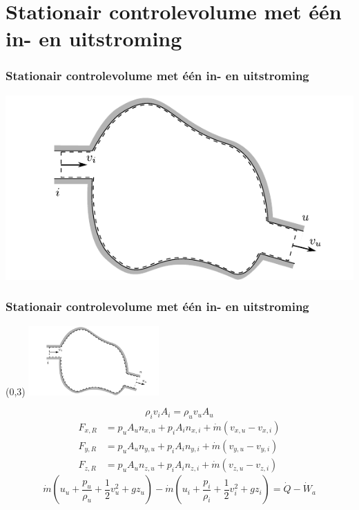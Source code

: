 \documentclass[t]{beamer}
\begin{document}
	\section{Stationair controlevolume met één in- en uitstroming}	
  	\begin{frame}
		\frametitle{Stationair controlevolume met één in- en uitstroming}
		\vspace{1cm}
		\centering
		\includegraphics{../fig/controlevolumes/Controlevolume_een_in_en_uitstroming}
	\end{frame}
  	\begin{frame}
		\frametitle{Stationair controlevolume met één in- en uitstroming}
		\begin{textblock}{5}(0,3)
            	\includegraphics[width=5cm]{../fig/controlevolumes/Controlevolume_een_in_en_uitstroming}
        	\end{textblock}
        	\vspace{2cm}
		\begin{equation}
			\rho_i v_{i} A_i = \rho_u v_{u} A_u
			\label{eqn:behoud van massa in een stationair controlevolume met een in en uitstroming}
		\end{equation}
		\pause
		\begin{align}
			F_{x,R} &= p_{u} A_u n_{x,u} + p_{i} A_i n_{x,i} + \dot{m} (v_{x,u}-v_{x,i}) \nonumber \\
			F_{y,R} &= p_{u} A_u n_{y,u} + p_{i} A_i n_{y,i} + \dot{m} (v_{y,u}-v_{y,i}) \\
			F_{z,R} &= p_{u} A_u n_{z,u} + p_{i} A_i n_{z,i} + \dot{m} (v_{z,u}-v_{z,i}) \nonumber
			\label{eqn:behoud van impuls in een stationair controlevolume met een in en uitstroming geprojecteerd2}
		\end{align}
		\pause
		\begin{equation}
			\dot{m} (u_u + \frac{p_u}{\rho_u} + \frac{1}{2}v^2_u + g z_u) - \dot{m} (u_i + \frac{p_i}{\rho_i}+ \frac{1}{2}v^2_i + g z_i) = \dot{Q}-\dot{W}_a
			\label{eqn:behoud van energie in een controlevolume met een in en uitstroming asvermogen}
		\end{equation}
	\end{frame}
\end{document}
